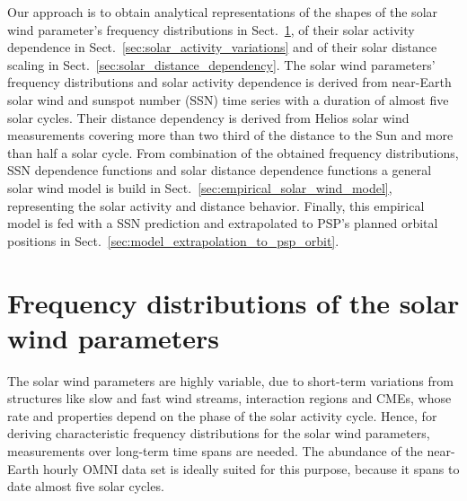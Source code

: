 Our approach is to obtain analytical representations of the shapes of the solar wind parameter’s frequency distributions in Sect.~\ref{sec:frequency_distribution}, of their solar activity dependence in Sect.~\ref{sec:solar_activity_variations} and of their solar distance scaling in Sect.~\ref{sec:solar_distance_dependency}. The solar wind parameters’ frequency distributions and solar activity dependence is derived from near-Earth solar wind and sunspot number (SSN) time series with a duration of almost five solar cycles. Their distance dependency is derived from Helios solar wind measurements covering more than two third of the distance to the Sun and more than half a solar cycle. From combination of the obtained frequency distributions, SSN dependence functions and solar distance dependence functions a general solar wind model is build in Sect.~\ref{sec:empirical_solar_wind_model}, representing the solar activity and distance behavior. Finally, this empirical model is fed with a SSN prediction and extrapolated to PSP's planned orbital positions in Sect.~\ref{sec:model_extrapolation_to_psp_orbit}.


\section{Frequency distributions of the solar wind parameters}
\label{sec:frequency_distribution}

The solar wind parameters are highly variable, due to short-term variations from structures like slow and fast wind streams, interaction regions and CMEs, whose rate and properties depend on the phase of the solar activity cycle. Hence, for deriving characteristic frequency distributions for the solar wind parameters, measurements over long-term time spans are needed. The abundance of the near-Earth hourly OMNI data set is ideally suited for this purpose, because it spans to date almost five solar cycles.

